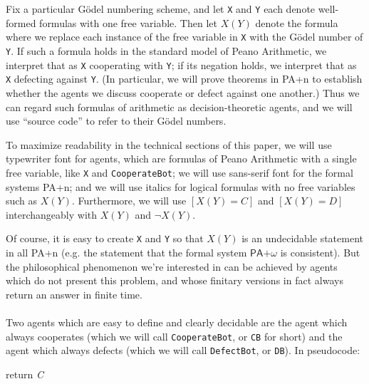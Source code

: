 \documentclass[12pt, letterpaper]{article}
\numberwithin{equation}{section}
\newenvironment{remark}[1][Remark]{\begin{trivlist}
\item[\hskip \labelsep {\bfseries #1}]}{\end{trivlist}}
\begin{document}
\\
\\ Fix a particular G\"{o}del numbering scheme, and let \texttt{X} and \texttt{Y} each denote well-formed formulas with one free variable. Then let $X(Y)$ denote the formula where we replace each instance of the free variable in \texttt{X} with the G\"{o}del number of \texttt{Y}. If such a formula holds in the standard model of Peano Arithmetic, we interpret that as \texttt{X} cooperating with \texttt{Y}; if its negation holds, we interpret that as \texttt{X} defecting against \texttt{Y}. (In particular, we will prove theorems in \textsf{PA+n} to establish whether the agents we discuss cooperate or defect against one another.) Thus we can regard such formulas of arithmetic as decision-theoretic agents, and we will use ``source code'' to refer to their G\"{o}del numbers.
\begin{remark}
To maximize readability in the technical sections of this paper, we will use typewriter font for agents, which are formulas of Peano Arithmetic with a single free variable, like \texttt{X} and \texttt{CooperateBot}; we will use sans-serif font for the formal systems \textsf{PA+n}; and we will use italics for logical formulas with no free variables such as $X(Y)$. Furthermore, we will use $[X(Y)=C]$ and $[X(Y)=D]$ interchangeably with $X(Y)$ and $\neg X(Y)$.
\end{remark}
Of course, it is easy to create \texttt{X} and \texttt{Y} so that $X(Y)$ is an undecidable statement in all \textsf{PA+n} (e.g. the statement that the formal system $\textsf{PA+}\omega$ is consistent). But the philosophical phenomenon we're interested in can be achieved by agents which do not present this problem, and whose finitary versions in fact always return an answer in finite time.\\
\\
Two agents which are easy to define and clearly decidable are the agent which always cooperates (which we will call \texttt{CooperateBot}, or \texttt{CB} for short) and the agent which always defects (which we will call \texttt{DefectBot}, or \texttt{DB}). In pseudocode:

\begin{algorithm}[H]


 return \emph{C}\;
 \caption{\texttt{CooperateBot (CB)}}
\end{algorithm}
\end{document}
